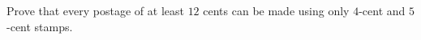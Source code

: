 Prove that every postage of at least $12$ cents can be made using only $4$-cent and $5$-cent stamps.
